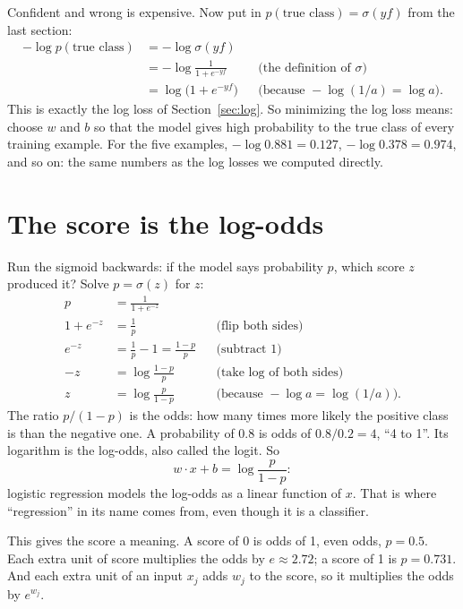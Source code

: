 \documentclass[11pt]{article}
\begin{document}
Confident and wrong is expensive. Now put in $p(\text{true class}) = \sigma(y f)$ from the last
section:
\begin{align*}
  -\log p(\text{true class})
    &= -\log \sigma(y f) \\
    &= -\log \frac{1}{1 + e^{-y f}} && \text{(the definition of } \sigma\text{)} \\
    &= \log\bigl(1 + e^{-y f}\bigr) && \text{(because } -\log(1/a) = \log a\text{)}.
\end{align*}
This is exactly the log loss of Section~\ref{sec:log}. So minimizing the log loss means: choose $w$
and $b$ so that the model gives high probability to the true class of every training example. For
the five examples, $-\log 0.881 = 0.127$, $-\log 0.378 = 0.974$, and so on: the same numbers as the
log losses we computed directly.

\section{The score is the log-odds}\label{sec:logodds}

Run the sigmoid backwards: if the model says probability $p$, which score $z$ produced it? Solve
$p = \sigma(z)$ for $z$:
\begin{align*}
  p &= \frac{1}{1 + e^{-z}} \\
  1 + e^{-z} &= \frac{1}{p} && \text{(flip both sides)} \\
  e^{-z} &= \frac{1}{p} - 1 = \frac{1 - p}{p} && \text{(subtract 1)} \\
  -z &= \log\frac{1 - p}{p} && \text{(take } \log \text{ of both sides)} \\
  z &= \log\frac{p}{1 - p} && \text{(because } -\log a = \log(1/a)\text{)}.
\end{align*}
The ratio $p / (1 - p)$ is the odds: how many times more likely the positive class is than the
negative one. A probability of 0.8 is odds of $0.8 / 0.2 = 4$, ``4 to 1''. Its logarithm is the
log-odds, also called the logit. So
\[
  w \cdot x + b = \log\frac{p}{1 - p} :
\]
logistic regression models the log-odds as a linear function of $x$. That is where ``regression'' in
its name comes from, even though it is a classifier.

This gives the score a meaning. A score of 0 is odds of 1, even odds, $p = 0.5$. Each extra unit of
score multiplies the odds by $e \approx 2.72$; a score of 1 is $p = 0.731$. And each extra unit of an
input $x_j$ adds $w_j$ to the score, so it multiplies the odds by $e^{w_j}$.
\end{document}
